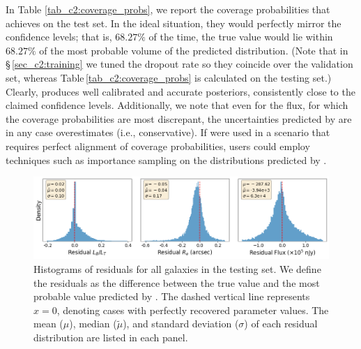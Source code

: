 In Table \ref{tab_c2:coverage_probs}, we report the coverage probabilities that \gampen{} achieves on the test set. 
In the ideal situation, they would perfectly mirror the confidence levels; that is, $68.27\%$ of the time, the true value would lie within $68.27\%$ of the most probable volume of the predicted distribution.
(Note that in \S\,\ref{sec_c2:training} we tuned the dropout rate so they coincide over the validation set, whereas Table\,\ref{tab_c2:coverage_probs} is calculated on the testing set.) 
Clearly, \gampen{} produces well calibrated and accurate posteriors, 
consistently close to the claimed confidence levels.
Additionally, we note that even for the flux, for which the coverage probabilities are most discrepant, the uncertainties predicted by \gampen{} are in any case overestimates (i.e., conservative). %
If \gampen{} were used in a scenario that requires perfect alignment of coverage probabilities, users could employ techniques such as importance sampling \citep{importance_sampling} on the distributions predicted by \gampen{}. 

\begin{figure}[htb]
    \centering
    \includegraphics[width
    =\textwidth]{residual_hists.png}
    \caption{Histograms of residuals for all galaxies in the testing set. We define the residuals as the difference between the true value and the most probable value predicted by \gampen{}. The dashed vertical line represents $x = 0$, denoting cases with perfectly recovered parameter values. 
    The mean ($\mu$), median ($\tilde{\mu}$), and standard deviation ($\sigma$) of each residual distribution are listed in each panel.
    }
    \label{fig_c2:residual_hists}
\end{figure}

